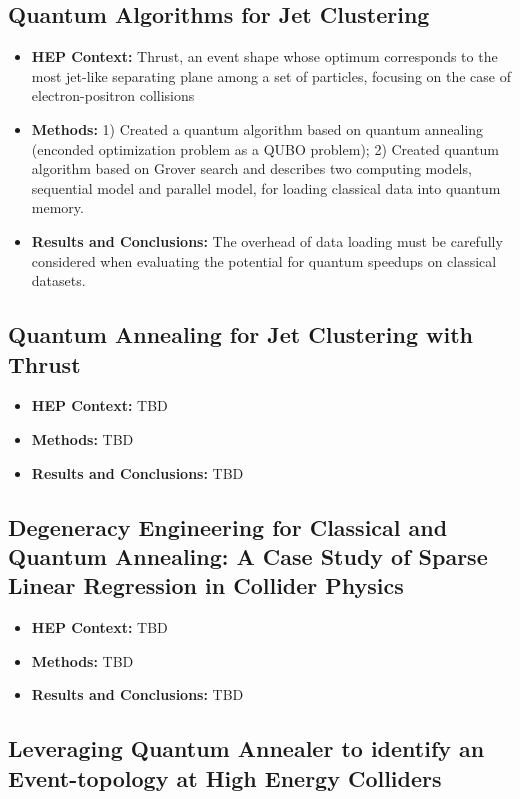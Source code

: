 \subsection{Quantum Algorithms for Jet Clustering~\cite{Wei:2019rqy}}
\begin{itemize}
	\item \textbf{HEP Context: }Thrust, an event shape whose optimum corresponds to the most jet-like separating plane among a set of particles, focusing on the case of electron-positron collisions
	\item \textbf{Methods: }1) Created a quantum algorithm based on quantum annealing (enconded optimization problem as a QUBO problem); 2) Created quantum algorithm based on Grover search and describes two computing models, sequential model and parallel model, for loading classical data into quantum memory.
	\item \textbf{Results and Conclusions: }The overhead of data loading must be carefully considered when evaluating the potential for quantum speedups on classical datasets.
\end{itemize}\subsection{Quantum Annealing for Jet Clustering with Thrust~\cite{Delgado:2022snu}}
\begin{itemize}
	\item \textbf{HEP Context: }TBD
	\item \textbf{Methods: }TBD
	\item \textbf{Results and Conclusions: }TBD
\end{itemize}\subsection{Degeneracy Engineering for Classical and Quantum Annealing: A Case Study of Sparse Linear Regression in Collider Physics~\cite{Anschuetz:2022rwu}}
\begin{itemize}
	\item \textbf{HEP Context: }TBD
	\item \textbf{Methods: }TBD
	\item \textbf{Results and Conclusions: }TBD
\end{itemize}\subsection{Leveraging Quantum Annealer to identify an Event-topology at High Energy Colliders~\cite{Kim:2021wrr}}
